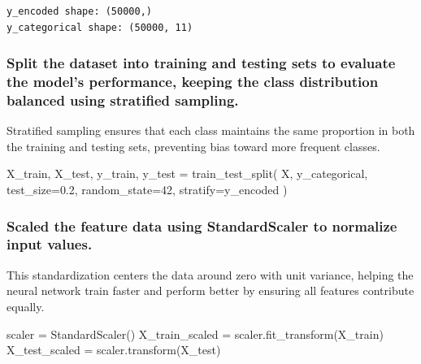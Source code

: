 \documentclass[
  letterpaper,
  DIV=11,
  numbers=noendperiod]{scrartcl}
\newenvironment{Shaded}{\begin{snugshade}}{\end{snugshade}}
\newcommand{\DecValTok}[1]{\textcolor[rgb]{0.68,0.00,0.00}{#1}}
\newcommand{\FloatTok}[1]{\textcolor[rgb]{0.68,0.00,0.00}{#1}}
\newcommand{\NormalTok}[1]{\textcolor[rgb]{0.00,0.23,0.31}{#1}}
\newcommand{\OperatorTok}[1]{\textcolor[rgb]{0.37,0.37,0.37}{#1}}
\begin{document}
\begin{verbatim}
y_encoded shape: (50000,)
y_categorical shape: (50000, 11)
\end{verbatim}

\subsubsection{Split the dataset into training and testing sets to
evaluate the model's performance, keeping the class distribution
balanced using stratified
sampling.}\label{split-the-dataset-into-training-and-testing-sets-to-evaluate-the-models-performance-keeping-the-class-distribution-balanced-using-stratified-sampling.}

Stratified sampling ensures that each class maintains the same
proportion in both the training and testing sets, preventing bias toward
more frequent classes.

\begin{Shaded}
\begin{Highlighting}[]
\NormalTok{X\_train, X\_test, y\_train, y\_test }\OperatorTok{=}\NormalTok{ train\_test\_split(}
\NormalTok{    X, y\_categorical, test\_size}\OperatorTok{=}\FloatTok{0.2}\NormalTok{, random\_state}\OperatorTok{=}\DecValTok{42}\NormalTok{, stratify}\OperatorTok{=}\NormalTok{y\_encoded}
\NormalTok{)}
\end{Highlighting}
\end{Shaded}

\subsubsection{Scaled the feature data using StandardScaler to normalize
input
values.}\label{scaled-the-feature-data-using-standardscaler-to-normalize-input-values.}

This standardization centers the data around zero with unit variance,
helping the neural network train faster and perform better by ensuring
all features contribute equally.

\begin{Shaded}
\begin{Highlighting}[]
\NormalTok{scaler }\OperatorTok{=}\NormalTok{ StandardScaler()}
\NormalTok{X\_train\_scaled }\OperatorTok{=}\NormalTok{ scaler.fit\_transform(X\_train)}
\NormalTok{X\_test\_scaled }\OperatorTok{=}\NormalTok{ scaler.transform(X\_test)}
\end{Highlighting}
\end{Shaded}
\end{document}
